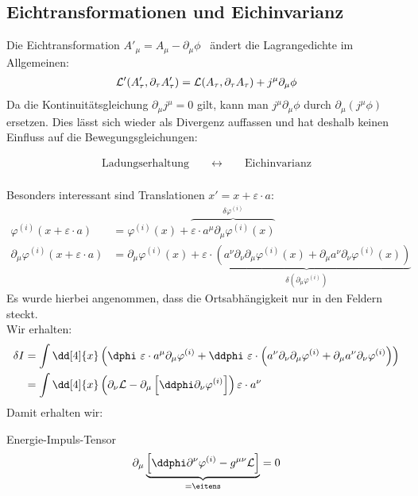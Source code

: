 \subsection{Eichtransformationen und Eichinvarianz}
Die Eichtransformation $A'_{\mu} = A_{\mu} - \partial_{\mu}\phi$ \ ändert die Lagrangedichte im Allgemeinen:
\begin{align*}
\mathcal{L}'(A'_{\tau},\partial_{\tau}A'_{\tau}) = \mathcal{L}(A_{\tau},\partial_{\tau}A_{\tau})+ j^{\mu}\partial_{\mu}\phi
\end{align*}
Da die Kontinuitätsgleichung $\partial_{\mu}j^{\mu}=0$ gilt, kann man $j^{\mu}\partial_{\mu}\phi$ durch $\partial_{\mu}(j^{\mu}\phi)$ ersetzen.
Dies lässt sich wieder als Divergenz auffassen und hat deshalb keinen Einfluss auf die Bewegungsgleichungen:

\begin{align*}
\text{Ladungserhaltung} \qquad \longleftrightarrow \qquad \text{Eichinvarianz}
\end{align*}
\\
Besonders interessant sind Translationen $x' = x + \varepsilon \cdot a$: 
\begin{align*}
\varphi^{(i)}(x + \varepsilon \cdot a) &= \varphi^{(i)}(x) + \overbrace{\varepsilon\cdot a^{\mu}\partial_{\mu}\varphi^{(i)}(x)}^{\delta\varphi^{(i)}} \\
\partial_{\mu}\varphi^{(i)}(x + \varepsilon \cdot a) &= \partial_{\mu}\varphi^{(i)}(x) + \underbrace{\varepsilon\cdot\left(a^{\nu}\partial_{\nu}\partial_{\mu}\varphi^{(i)}(x) + \partial_{\mu}a^{\nu}\partial_{\nu}\varphi^{(i)}(x)\right)}_{\delta(\partial_{\mu}\varphi^{(i)})} 
\end{align*}
Es wurde hierbei angenommen, dass die Ortsabhängigkeit nur in den Feldern steckt. \\
Wir erhalten:
\begin{align*}
\delta I &= \int \dd[4]{x} \left( \dphi \ \varepsilon\cdot a^{\mu}\partial_{\mu}\varphi^{(i)} + \ddphi \ \varepsilon\cdot\left(a^{\nu}\partial_{\nu}\partial_{\mu}\varphi^{(i)}+\partial_{\mu}a^{\nu}\partial_{\nu}\varphi^{(i)}\right) \right) \\
&= \int \dd[4]{x} \left( \partial_{\nu}\lagr - \partial_{\mu} \left[\ddphi \partial_{\nu}\varphi^{(i)}\right] \right) \varepsilon\cdot a^{\nu}
\end{align*}
Damit erhalten wir:
\begin{mybox}{Energie-Impuls-Tensor}
\begin{align}
\partial_{\mu}\underbrace{\left[ \ddphi \partial^{\nu}\varphi^{(i)} - g^{\mu \nu}\lagr \right]}_{ = \eitens} = 0
\end{align}
\end{mybox}

